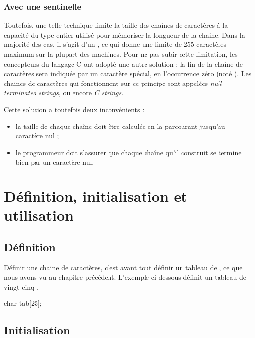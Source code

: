 \subsubsection{Avec une sentinelle}
\label{avec-une-sentinelle}

Toutefois, une telle technique limite la taille des chaînes de
caractères à la capacité du type entier utilisé pour mémoriser la
longueur de la chaine. Dans la majorité des cas, il s'agit d'un
, ce qui donne une limite de 255 caractères
maximum sur la plupart des machines. Pour ne pas subir cette limitation,
les concepteurs du langage C ont adopté une autre solution : la fin de
la chaîne de caractères sera indiquée par un caractère spécial, en
l'occurrence zéro (noté
\mybox{\textquotesingle{}\textbackslash{}0\textquotesingle{}}). Les
chaines de caractères qui fonctionnent sur ce principe sont appelées
\emph{null terminated strings}, ou encore \emph{C strings}.

Cette solution a toutefois deux inconvénients :

\begin{itemize}
\item
  la taille de chaque chaîne doit être calculée en la parcourant
  jusqu'au caractère nul ;
\item
  le programmeur doit s'assurer que chaque chaîne qu'il construit se
  termine bien par un caractère nul.
\end{itemize}

\section{Définition, initialisation et utilisation }
\label{definition,-initialisation-et-utilisation }

\subsection{Définition}
\label{definition-5}

Définir une chaine de caractères, c'est avant tout définir un tableau de
, ce que nous avons vu au chapitre précédent. L'exemple
ci-dessous définit un tableau de vingt-cinq .

\begin{C}
char tab[25];
\end{C}

\subsection{Initialisation}
\label{initialisation-6}

